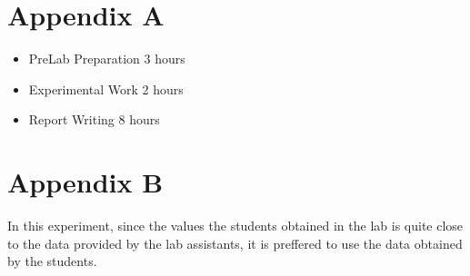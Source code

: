 \documentclass[letterpaper,12pt]{article}
\begin{document}
\section*{Appendix A}
\begin{itemize}
    \item PreLab Preparation 3 hours
    \item Experimental Work 2  hours
    \item Report Writing 8 hours
\end{itemize}
\section*{Appendix B}
In this experiment, since the values the students obtained in the lab is quite close to the data provided by the lab assistants, it is preffered to use the data obtained by the students.
\end{document}
